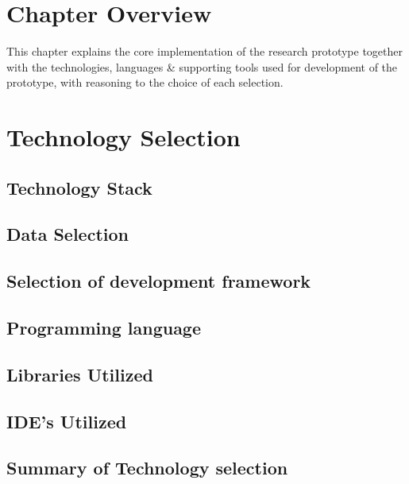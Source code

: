 \section{Chapter Overview}
This chapter explains the core implementation of the research prototype together with the technologies, languages \& supporting tools used for development of the prototype, with reasoning to the choice of each selection.

\section{Technology Selection}

\subsection{Technology Stack}


\subsection{Data Selection}


\subsection{Selection of development framework}


\subsection{Programming language}

\subsection{Libraries Utilized}

\subsection{IDE’s Utilized}

\subsection{Summary of Technology selection}


